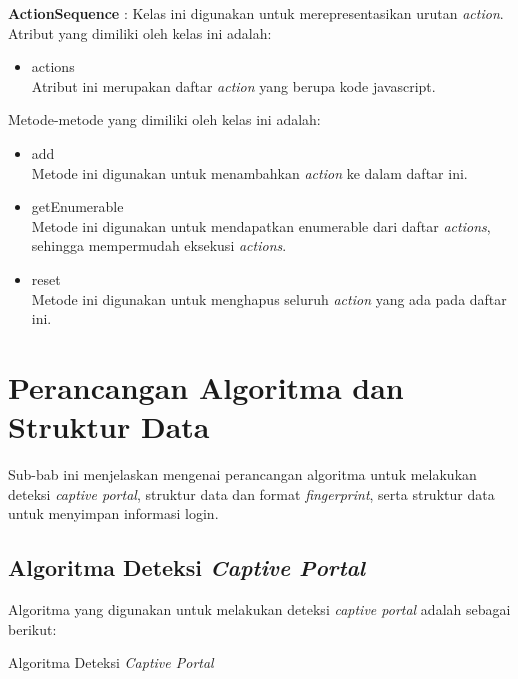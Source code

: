\par{\textbf{ActionSequence} : Kelas ini digunakan untuk merepresentasikan urutan \textit{action}. Atribut yang dimiliki oleh kelas ini adalah:
    \begin{itemize}
        \item{actions\\Atribut ini merupakan daftar \textit{action} yang berupa kode javascript.}
    \end{itemize}
    Metode-metode yang dimiliki oleh kelas ini adalah:
    \begin{itemize}
        \item{add\\Metode ini digunakan untuk menambahkan \textit{action} ke dalam daftar ini.}
        \item{getEnumerable\\Metode ini digunakan untuk mendapatkan enumerable dari daftar \textit{actions}, sehingga mempermudah eksekusi \textit{actions}.}
        \item{reset\\Metode ini digunakan untuk menghapus seluruh \textit{action} yang ada pada daftar ini.}
    \end{itemize}
}



\section{Perancangan Algoritma dan Struktur Data}
\label{sec:perancangan_algoritma_dan_struktur_data}

Sub-bab ini menjelaskan mengenai perancangan algoritma untuk melakukan deteksi \textit{captive portal}, struktur data dan format \textit{fingerprint}, serta struktur data untuk menyimpan informasi login.

\subsection{Algoritma Deteksi \textit{Captive Portal}}
\label{subsec:algoritma_deteksi_captive_portal}

Algoritma yang digunakan untuk melakukan deteksi \textit{captive portal} adalah sebagai berikut:

\hfill

\begin{algorithm}[H]
    \caption{Algoritma Deteksi \textit{Captive Portal}}
    \label{algotitma_deteksi_captive_portal}
\end{algorithm}

